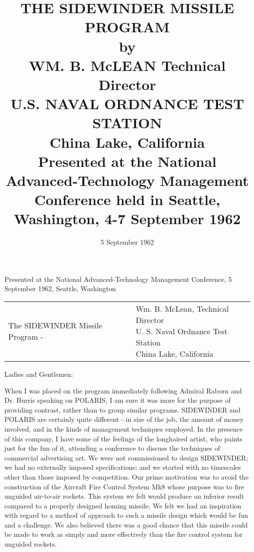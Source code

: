 \documentclass{memoir}
\title{%
  THE SIDEWINDER MISSILE PROGRAM \\
  \large by \\
         WM. B. McLEAN Technical Director \\
         U.S. NAVAL ORDNANCE TEST STATION \\
         China Lake, California \\
         \vspace{12cm}
  \small Presented at the National Advanced-Technology Management Conference held in Seattle, Washington, 4-7 September 1962
}
\date{5 September 1962}
\begin{document}
\maketitle

Presented at the National Advanced-Technology Management Conference, 5 September 1962, Seattle, Washington

\vspace{5mm}

\begin{tabular}{ll}
The SIDEWINDER Missile Program - & \parbox[t]{8cm}{
                                   Wm. B. McLean, Technical Director \\
                                   U. S. Naval Ordnance Test Station \\
                                   China Lake, California}
\end{tabular}

\vspace{5mm}

Ladies and Gentlemen:

When I was placed on the program immediately following Admiral Raborn and Dr. Burris speaking on POLARIS, I am sure it was more for the purpose of providing contrast, rather than to group similar programs. SIDEWINDER and POLARIS are certainly quite different---in size of the job, the amount of money involved, and in the kinds of management techniques employed. In the presence of this company, I have some of the feelings of the longhaired artist, who paints just for the fun of it, attending a conference to discuss the techniques of commercial advertising art. We were not commissioned to design SIDEWINDER; we had no externally imposed specifications; and we started with no timescales other than those imposed by competition. Our prime motivation was to avoid the construction of the Aircraft Fire Control System Mk8 whose purpose was to fire unguided air-to-air rockets. This system we felt would produce an inferior result compared to a properly designed homing missile. We felt we had an inspiration with regard to a method of approach to such a missile design which would be fun and a challenge. We also believed there was a good chance that this missile could be made to work as simply and more effectively than the fire control system for unguided rockets.
\end{document}
